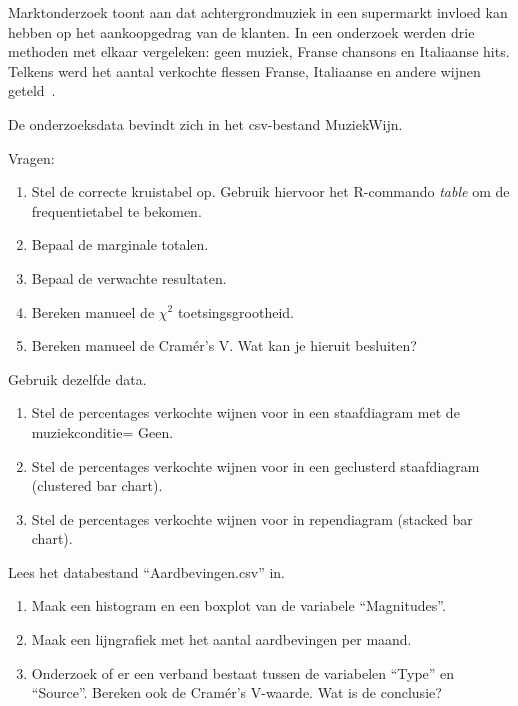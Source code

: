 \begin{exercise}
  \label{ex:muziekwijn-analyse} %

  Marktonderzoek toont aan dat achtergrondmuziek in een supermarkt invloed kan hebben op het aankoopgedrag van de klanten. In een onderzoek werden drie methoden met elkaar vergeleken: geen muziek, Franse chansons en Italiaanse hits. Telkens werd het aantal verkochte flessen Franse, Italiaanse en andere wijnen geteld~\autocite{Ryan1998}.
  
  De onderzoeksdata bevindt zich in het csv-bestand MuziekWijn.

  Vragen:
  \begin{enumerate}
    \item Stel de correcte kruistabel op. Gebruik hiervoor het R-commando \textit{table} om de frequentietabel te bekomen.
    \item Bepaal de marginale totalen.
    \item Bepaal de verwachte resultaten.
    \item Bereken manueel de $\chi^{2}$ toetsingsgrootheid.  
    \item Bereken manueel de Cramér's V. Wat kan je hieruit besluiten?
  \end{enumerate}
\end{exercise}

\begin{exercise}
  \label{ex:muziekwijn-visualisatie}
	Gebruik dezelfde data.
		\begin{enumerate}
		\item Stel de percentages verkochte wijnen voor in een staafdiagram met de  muziekconditie= Geen.
		\item Stel de percentages verkochte wijnen voor in een geclusterd staafdiagram (clustered bar chart).
		\item Stel de percentages verkochte wijnen voor in rependiagram (stacked bar chart).
	\end{enumerate}
\end{exercise}

\begin{exercise}
	\label{ex:aardbevingen} %
Lees het databestand ``Aardbevingen.csv'' in. 	
		\begin{enumerate}
		\item Maak een histogram en een boxplot van de variabele ``Magnitudes''.
		\item Maak een lijngrafiek met het aantal aardbevingen per maand.
		\item Onderzoek of er een verband bestaat tussen de variabelen ``Type'' en ``Source''. Bereken ook de Cramér's V-waarde. Wat is de conclusie?
	\end{enumerate}
\end{exercise}

